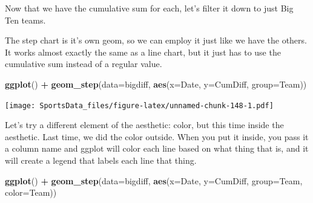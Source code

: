 \documentclass[]{book}
\newenvironment{Shaded}{\begin{snugshade}}{\end{snugshade}}
\newcommand{\KeywordTok}[1]{\textcolor[rgb]{0.13,0.29,0.53}{\textbf{#1}}}
\newcommand{\DataTypeTok}[1]{\textcolor[rgb]{0.13,0.29,0.53}{#1}}
\newcommand{\StringTok}[1]{\textcolor[rgb]{0.31,0.60,0.02}{#1}}
\newcommand{\OperatorTok}[1]{\textcolor[rgb]{0.81,0.36,0.00}{\textbf{#1}}}
\newcommand{\NormalTok}[1]{#1}
\begin{document}
\begin{Shaded}
\end{Shaded}

Now that we have the cumulative sum for each, let's filter it down to
just Big Ten teams.

\begin{Shaded}
\end{Shaded}

The step chart is it's own geom, so we can employ it just like we have
the others. It works almost exactly the same as a line chart, but it
just has to use the cumulative sum instead of a regular value.

\begin{Shaded}
\begin{Highlighting}[]
\KeywordTok{ggplot}\NormalTok{() }\OperatorTok{+}\StringTok{ }\KeywordTok{geom_step}\NormalTok{(}\DataTypeTok{data=}\NormalTok{bigdiff, }\KeywordTok{aes}\NormalTok{(}\DataTypeTok{x=}\NormalTok{Date, }\DataTypeTok{y=}\NormalTok{CumDiff, }\DataTypeTok{group=}\NormalTok{Team))}
\end{Highlighting}
\end{Shaded}

\texttt{[image: SportsData\_files/figure-latex/unnamed-chunk-148-1.pdf]}

Let's try a different element of the aesthetic: color, but this time
inside the aesthetic. Last time, we did the color outside. When you put
it inside, you pass it a column name and ggplot will color each line
based on what thing that is, and it will create a legend that labels
each line that thing.

\begin{Shaded}
\begin{Highlighting}[]
\KeywordTok{ggplot}\NormalTok{() }\OperatorTok{+}\StringTok{ }\KeywordTok{geom_step}\NormalTok{(}\DataTypeTok{data=}\NormalTok{bigdiff, }\KeywordTok{aes}\NormalTok{(}\DataTypeTok{x=}\NormalTok{Date, }\DataTypeTok{y=}\NormalTok{CumDiff, }\DataTypeTok{group=}\NormalTok{Team, }\DataTypeTok{color=}\NormalTok{Team))}
\end{Highlighting}
\end{Shaded}
\end{document}

